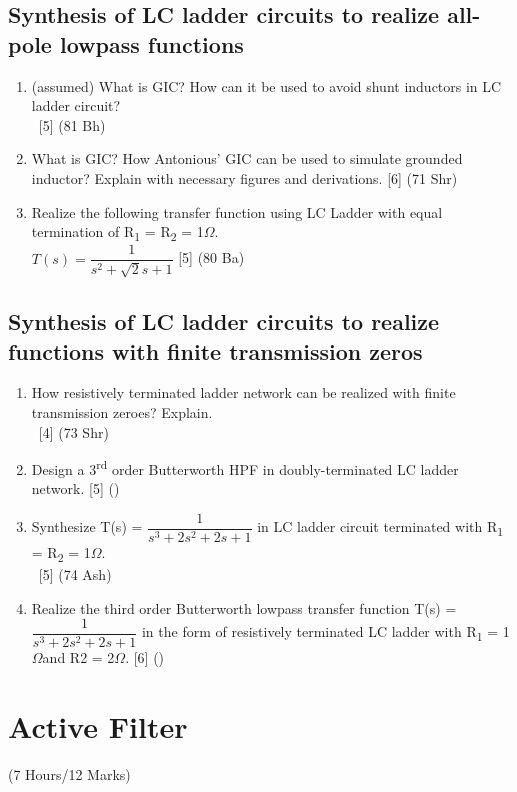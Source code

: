 \documentclass[12pt]{article}
\newcommand{\W}{\(\Omega\)}
\newcommand{\enter}{\\\textcolor{white}{1}}
\newcommand{\sub}[1]{\textsubscript{#1}}
\newcommand{\super}[1]{\textsuperscript{#1}}
\begin{document}
\subsection{Synthesis of LC ladder circuits to realize all-pole lowpass functions}
	\begin{enumerate}
		\item (assumed) What is GIC? How can it be used to avoid shunt inductors in LC ladder circuit?
\enter\hfill [5] (81 Bh)

		\item What is GIC? How Antonious' GIC can be used to simulate grounded inductor? Explain with necessary figures and derivations. \hfill [6] (71 Shr)

		\item Realize the following transfer function using LC Ladder with equal termination of R\sub{1} = R\sub{2} = 1\W.\\
		$T(s) = \dfrac{1}{s^2+\sqrt{2}s+1}$ \hfill [5] (80 Ba)
	\end{enumerate}
\subsection{Synthesis of LC ladder circuits to realize functions with finite transmission zeros}
	\begin{enumerate}[noitemsep, topsep=0pt]
		\item How resistively terminated ladder network can be realized with finite transmission zeroes? Explain.
		\enter\hfill [4] (73 Shr)
		
		\item Design a 3\super{rd} order Butterworth HPF in doubly-terminated LC ladder network. \hfill [5] ()
		
		\item Synthesize T(s) = $\dfrac{1}{s^3+2s^2+2s+1}$ in LC ladder circuit terminated with R\sub{1} = R\sub{2} = 1\W.
		\enter\hfill [5] (74 Ash)
		
		\item Realize the third order Butterworth lowpass transfer function T(s) = $\dfrac{1}{s^3+2s^2+2s+1}$ in the form of resistively terminated LC ladder with R\sub{1} = 1\W and R2 = 2\W. \hfill [6] ()
	\end{enumerate}

\pagebreak
\section{Active Filter}
\begin{center}(7 Hours/12 Marks)\end{center}
\end{document}
